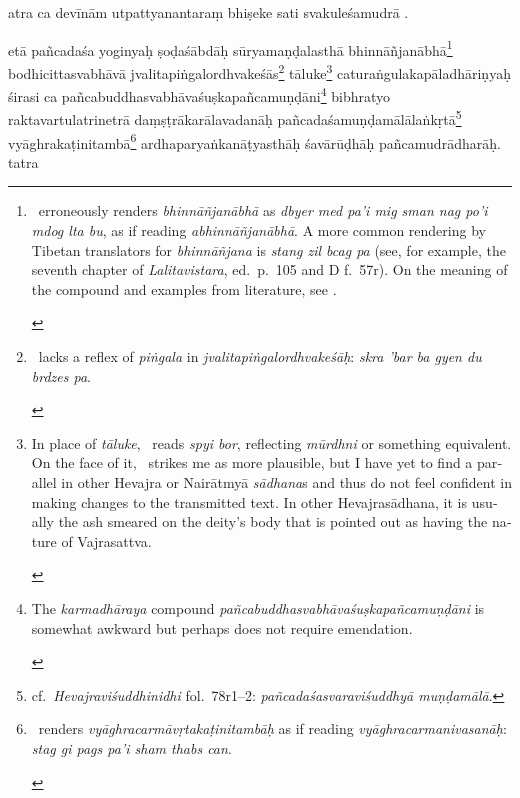 \documentclass[naipra.tex]{subfiles}
\begin{document}
\begin{sanskrit}
\pstart
atra ca devīnām utpattyanantaraṃ bhiṣeke sati svakuleśamudrā . 
\pend


\pstart
etā pañcadaśa yoginyaḥ ṣoḍaśābdāḥ sūryamaṇḍalasthā bhinnāñjanābhā\footnote{
	\begin{english}%
		\TIB\ erroneously renders \emph{bhinnāñjanābhā} as \emph{dbyer med pa'i mig sman nag po'i mdog lta bu}, as if reading \emph{abhinnāñjanābhā}.
		A more common rendering by Tibetan translators for \emph{bhinnāñjana} is \emph{stang zil bcag pa} (see, for example, the seventh chapter of \emph{Lalitavistara}, ed.\ p.\ 105 and D f.\ 57r).
		On the meaning of the compound and examples from literature, see \cite{vogel1968}.
	\end{english}
} bodhicittasvabhāvā jvalitapiṅgalordhvakeśās\footnote{
	\begin{english}%
		\TIB\ lacks a reflex of \emph{piṅgala} in \emph{jvalitapiṅgalordhvakeśāḥ}: \emph{skra 'bar ba gyen du brdzes pa}.
	\end{english}
} \crux tāluke\crux\footnote{
	\begin{english}%
		In place of \emph{tāluke}, \TIB\ reads \emph{spyi bor}, reflecting \emph{mūrdhni} or something equivalent.
		On the face of it, \TIB\ strikes me as more plausible, but I have yet to find a parallel in other Hevajra or Nairātmyā \emph{sādhana}s and thus do not feel confident in making changes to the transmitted text. 
		In other Hevajrasādhana, it is usually the ash smeared on the deity's body that is pointed out as having the nature of Vajrasattva.
	\end{english}
} caturaṅgulakapāladhāriṇyaḥ śirasi ca pañcabuddhasvabhāvaśuṣkapañcamuṇḍāni\footnote{
	\begin{english}%
		The \emph{karmadhāraya} compound \emph{pañcabuddhasvabhāvaśuṣkapañcamuṇḍāni} is somewhat awkward but perhaps does not require emendation.
	\end{english}
} bibhratyo raktavartulatrinetrā daṃṣṭrākarālavadanāḥ pañcadaśamuṇḍamālālaṅkṛtā\footnote{
	cf.\ \emph{Hevajraviśuddhinidhi} fol.\ 78r1–2: \emph{pañcadaśasvaraviśuddhyā muṇḍamālā}.
} vyāghrakaṭinitambā\footnote{
	\begin{english}%
		\TIB\ renders \emph{vyāghracarmāvṛtakaṭinitambāḥ} as if reading \emph{vyāghracarmanivasanāḥ}: \emph{stag gi pags pa'i sham thabs can}.
	\end{english}
} ardhaparyaṅkanāṭyasthāḥ śavārūḍhāḥ pañcamudrādharāḥ. tatra\Emdash
\pend


\end{sanskrit}
\end{document}
